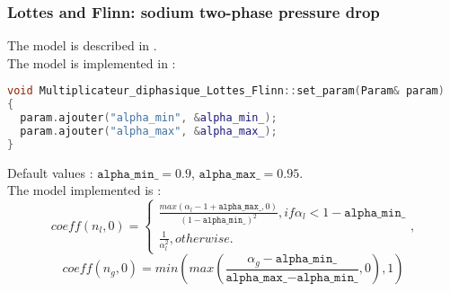 \subsubsection{Lottes and Flinn: sodium two-phase pressure drop}
The model is described in \textcite{lottes1956method}.\\
The model is implemented in :
\begin{lstlisting}[language=c++]
void Multiplicateur_diphasique_Lottes_Flinn::set_param(Param& param)
{
  param.ajouter("alpha_min", &alpha_min_);
  param.ajouter("alpha_max", &alpha_max_);
}
\end{lstlisting}
Default values : $\texttt{alpha\_min\_} = 0.9$, $\texttt{alpha\_max\_} = 0.95$. \\
The model implemented is :
\begin{equation}
    coeff(n_l, 0) = \begin{cases}\frac{max(\alpha_l-1+\texttt{alpha\_max\_},0)}{(1-\texttt{alpha\_min\_})^2} , if \alpha_l<1-\texttt{alpha\_min\_}\\
    \frac{1}{\alpha_l^2}, otherwise.
    \end{cases},
\end{equation}
\begin{equation}
    coeff(n_g, 0) = min(max(\frac{\alpha_g-\texttt{alpha\_min\_}}{\texttt{alpha\_max\_}-\texttt{alpha\_min\_}},0),1)
\end{equation}

